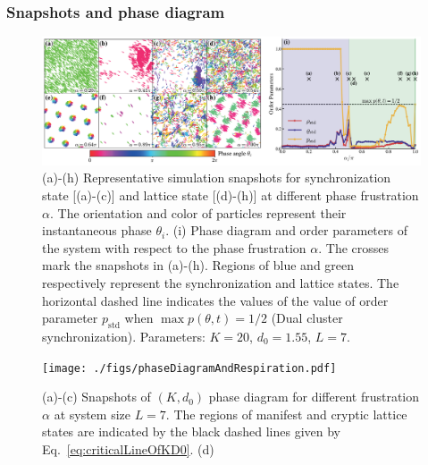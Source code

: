 \documentclass{article}
\begin{document}
\newpage
\subsubsection{Snapshots and phase diagram}

\begin{figure}[H]
    \centering
    \includegraphics[width=\textwidth]{./figs/snapshotsAndPhaseDiagram.pdf}
    \caption{
        \label{fig:snapshotsAndPhaseDiagram}
        (a)-(h) Representative simulation snapshots for synchronization state [(a)-(c)] and lattice state [(d)-(h)] at different phase frustration $\alpha$. The orientation and color of particles represent their instantaneous phase $\theta_i$.
        (i) Phase diagram and order parameters of the system with respect to the phase frustration $\alpha$. The crosses mark the snapshots in (a)-(h). Regions of blue and green respectively represent the synchronization and lattice states. The horizontal dashed line indicates the values of the value of order parameter $p_{\mathrm{std}}$ when $\max p(\theta, t)=1/2$ (Dual cluster synchronization). Parameters: $K=20$, $d_0=1.55$, $L=7$.
    }
\end{figure}

\begin{figure}[H]
    \centering
    \texttt{[image: ./figs/phaseDiagramAndRespiration.pdf]}
    \caption{
        \label{fig:phaseDiagramAndRespiration}
        (a)-(c) Snapshots of $(K, d_0)$ phase diagram for different frustration $\alpha$ at system size $L=7$. The regions of manifest and cryptic lattice states are indicated by the black dashed lines given by Eq.~\eqref{eq:criticalLineOfKD0}. (d) 
    }
\end{figure}
\end{document}
